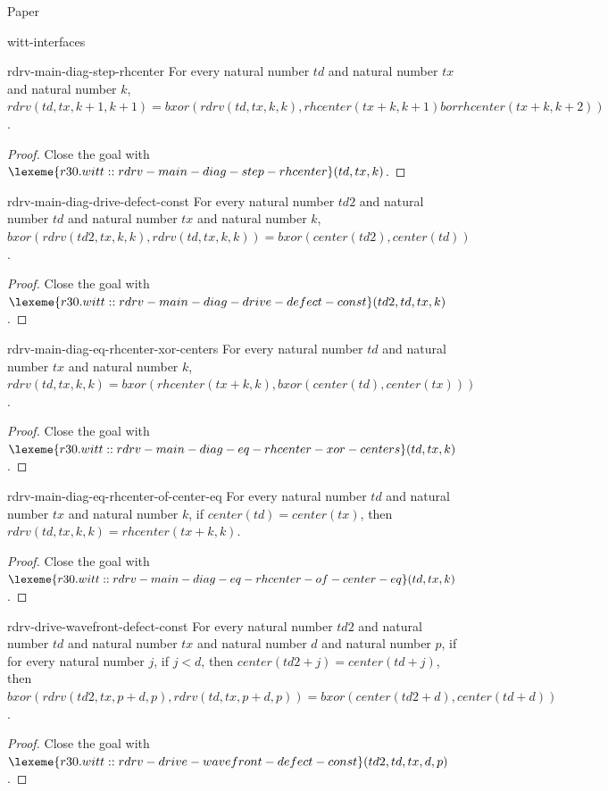 \begin{lexlean}{Paper}
\begin{section}{witt-interfaces}
  \begin{theorem}{rdrv-main-diag-step-rhcenter}
  For every natural number \(td\) and natural number \(tx\) and natural number \(k\), \(rdrv(td, tx, k + 1, k + 1) = bxor(rdrv(td, tx, k, k), rhcenter(tx + k, k + 1) bor rhcenter(tx + k, k + 2))\).
  \begin{proof}
  Close the goal with \(\lexeme{r30.witt::rdrv-main-diag-step-rhcenter}(td, tx, k)\).
  \end{proof}
  \end{theorem}

  \begin{theorem}{rdrv-main-diag-drive-defect-const}
  For every natural number \(td2\) and natural number \(td\) and natural number \(tx\) and natural number \(k\), \(bxor(rdrv(td2, tx, k, k), rdrv(td, tx, k, k)) = bxor(center(td2), center(td))\).
  \begin{proof}
  Close the goal with \(\lexeme{r30.witt::rdrv-main-diag-drive-defect-const}(td2, td, tx, k)\).
  \end{proof}
  \end{theorem}

  \begin{theorem}{rdrv-main-diag-eq-rhcenter-xor-centers}
  For every natural number \(td\) and natural number \(tx\) and natural number \(k\), \(rdrv(td, tx, k, k) = bxor(rhcenter(tx + k, k), bxor(center(td), center(tx)))\).
  \begin{proof}
  Close the goal with \(\lexeme{r30.witt::rdrv-main-diag-eq-rhcenter-xor-centers}(td, tx, k)\).
  \end{proof}
  \end{theorem}

  \begin{theorem}{rdrv-main-diag-eq-rhcenter-of-center-eq}
  For every natural number \(td\) and natural number \(tx\) and natural number \(k\), if \(center(td) = center(tx)\), then \(rdrv(td, tx, k, k) = rhcenter(tx + k, k)\).
  \begin{proof}
  Close the goal with \(\lexeme{r30.witt::rdrv-main-diag-eq-rhcenter-of-center-eq}(td, tx, k)\).
  \end{proof}
  \end{theorem}

  \begin{theorem}{rdrv-drive-wavefront-defect-const}
  For every natural number \(td2\) and natural number \(td\) and natural number \(tx\) and natural number \(d\) and natural number \(p\), if for every natural number \(j\), if \(j < d\), then \(center(td2 + j) = center(td + j)\), then \(bxor(rdrv(td2, tx, p + d, p), rdrv(td, tx, p + d, p)) = bxor(center(td2 + d), center(td + d))\).
  \begin{proof}
  Close the goal with \(\lexeme{r30.witt::rdrv-drive-wavefront-defect-const}(td2, td, tx, d, p)\).
  \end{proof}
  \end{theorem}


\end{section}
\end{lexlean}
